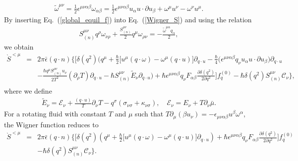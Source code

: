 \documentclass[aps,prd,showkeys,preprint,amsmath,amssymb,nofootinbib]{revtex4-1}
\begin{document}
\begin{eqnarray}
\tilde{\omega}^{\mu\nu}=\frac{1}{2}\epsilon^{\mu\nu\alpha\beta}\omega_{\alpha\beta}=\frac{1}{2}\epsilon^{\mu\nu\alpha\beta}u_{\alpha}u\cdot\partial u_{\beta}+\omega^{\mu}u^{\nu}-\omega^{\nu}u^{\mu}.
\end{eqnarray}
By inserting Eq.~(\ref{global_equil_f}) into Eq.~(\ref{Wigner_S}) and using the relation
\begin{eqnarray}\nonumber
	S^{\mu\nu}_{(n)}q^{\rho}\omega_{\nu\rho}+\frac{S^{\rho\nu}_{(n)}}{2}q^{\mu}\omega_{\rho\nu}
	=-\frac{\tilde{\omega}^{\mu\alpha}q_{\alpha}}{2},
\end{eqnarray}
we obtain
\begin{eqnarray}\nonumber\label{Wigner_eq_nframe}
	\grave{S}^{<\mu}&=&2\pi\bar{\epsilon}(q\cdot n)\Bigg\{\Bigg[
	\delta(q^2)\Bigg(q^{\mu}+\frac{\hbar}{2}\big[u^{\mu}(q\cdot\omega)-\omega^{\mu}(q\cdot u)\big]\partial_{q\cdot u}
	-\frac{\hbar}{4}\big(\epsilon^{\mu\nu\alpha\beta}q_{\nu}u_{\alpha}u\cdot\partial u_{\beta}\big)\partial_{q\cdot u}
	\\ \nonumber
	&&
	-\frac{\hbar q^{\mu}S_{(n)}^{\rho\nu}u_{\nu}}{2T^2}(\partial_{\rho}T)
	\partial_{q\cdot u}
	-\hbar S_{(n)}^{\mu\nu}\tilde{E}_{\nu}\partial_{q\cdot u}
	\Bigg)
	+\hbar\epsilon^{\mu\nu\alpha\beta}q_{\nu}F_{\alpha\beta}\frac{\partial\delta(q^2)}{2\partial q^2}
	\Bigg]f^{(0)}_q-\hbar\delta(q^2)S_{(n)}^{\mu\nu}\mathcal{C}_{\nu}\Bigg\},
\\
\end{eqnarray}
where we define
\begin{eqnarray}
\tilde{E}_{\nu}=\mathcal{E}_{\nu}+ \frac{(q\cdot u)}{T}\partial_{\nu}T
-q^{\sigma}(\sigma_{\nu\sigma}+\kappa_{\nu\sigma}),\quad \mathcal{E}_{\nu}=E_{\nu}+T \partial_{\nu}\bar{\mu}.
\end{eqnarray}
For a rotating fluid with constant $T$ and $\mu$ such that $T\partial_{\mu}(\beta u_{\nu})=
-\epsilon_{\mu\nu\alpha\beta}u^{\beta}\omega^{\alpha}$,  the Wigner function reduces to
\begin{eqnarray}\nonumber
\grave{S}^{<\mu}&=&2\pi\bar{\epsilon}(q\cdot n)\Bigg\{\Bigg[
\delta(q^2)\left(q^{\mu}+\frac{\hbar}{2}\big[u^{\mu}(q\cdot\omega)-\omega^{\mu}(q\cdot u)\big]\partial_{q\cdot u}\right)
+\hbar\epsilon^{\mu\nu\alpha\beta}q_{\nu}F_{\alpha\beta}\frac{\partial\delta(q^2)}{2\partial q^2}
\Bigg]f^{(0)}_q
\\
&&
-\hbar\delta(q^2)S_{(n)}^{\mu\nu}\mathcal{C}_{\nu}\Bigg\}.
\end{eqnarray}
\end{document}
